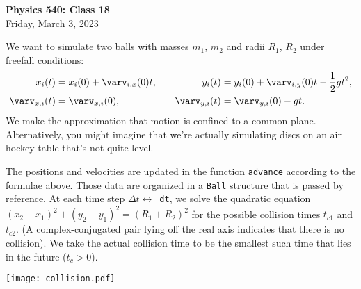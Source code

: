 \documentclass[11pt]{article}
\begin{document}
\color{white}

\begin{center}
{\large\bf Physics 540: Class 18}\\
{\small Friday, March 3, 2023}
\end{center}

We want to simulate two balls with masses $m_1$, $m_2$ and radii $R_1$, 
$R_2$ under freefall conditions:
\begin{alignat*}{2} 
           x_i(t) &= x_i(0) + \varv_{i,x}(0)t, \ \ \
         & y_i(t) &= y_i(0) + \varv_{i,y}(0)t - \frac{1}{2}gt^2,\\
   \varv_{x,i}(t) &= \varv_{x,i}(0), &\varv_{y,i}(t) 
                  &= \varv_{y,i}(0) - gt.
\end{alignat*}
We make the approximation that motion is confined to a common plane. 
Alternatively, you might imagine that we're actually simulating discs 
on an air hockey table that's not quite level.

The positions and velocities are updated in the function \verb!advance! 
according to the formulae above. Those data are organized in a \verb!Ball!
structure that is passed by  reference. At each time step 
$\Delta t \leftrightarrow $~\verb!dt!, we solve the quadratic equation 
$(x_2-x_1)^2 + (y_2-y_1)^2 = (R_1+R_2)^2$ for the possible collision times
$t_{c1}$ and $t_{c2}$. (A complex-conjugated pair lying off the real axis
indicates that there is no collision). We take the actual collision time 
to be the smallest such time that lies in the future ($t_c > 0$).

\begin{center}
\texttt{[image: collision.pdf]}
\end{center}
\end{document}
